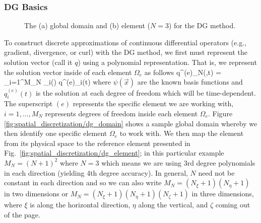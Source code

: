 \documentclass{article}
\begin{document}
\subsubsection{DG Basics}

\begin{figure}[htbp]
\begin{center}
\end{center}
\caption{The (a) global domain and (b) element ($N=3$) for the DG method.}
\label{fig:spatial_discretization/dg_method}
\end{figure}

To construct discrete approximations of continuous differential operators (e.g., gradient, divergence, or curl) with the DG method, we first must represent the solution vector (call it $q$) using a polynomial representation.  That is, we represent the solution vector inside of each element $\Omega_e$ as follows
\be
q^{(e)}_N(,t) = \sum_{i=1}^{M_N} \psi_i() q^{(e)}_i(t)
\label{eq:spatial_discretization/dg_method}
\ee
where $\psi(\vec{x})$ are the known basis functions and $q^{(e)}_i(t)$ is the solution at each degree of freedom which will be time-dependent.
The superscript $(e)$ represents the specific element we are working with, $i=1,\ldots,M_N$ represents degrees of freedom inside each element $\Omega_e$.  Figure \ref{fig:spatial_discretization/dg_domain} shows a sample global domain whereby we then identify one specific element $\Omega_e$ to work with.  We then map the element from its physical space to the reference element presented in Fig.\ \ref{fig:spatial_discretization/dg_element}; in this particular example $M_N=(N+1)^2$ where $N=3$ which means we are using 3rd degree polynomials in each direction (yielding 4th degree accuracy).  In general, $N$ need not be constant in each direction and so we can also write $M_N=(N_{\xi}+1)(N_{\eta}+1)$ in two dimensions or $M_N=(N_{\xi}+1)(N_{\eta}+1)(N_{\zeta}+1)$ in three dimensions, where $\xi$ is along the horizontal direction, $\eta$ along the vertical, and $\zeta$ coming out of the page. 
\end{document}
